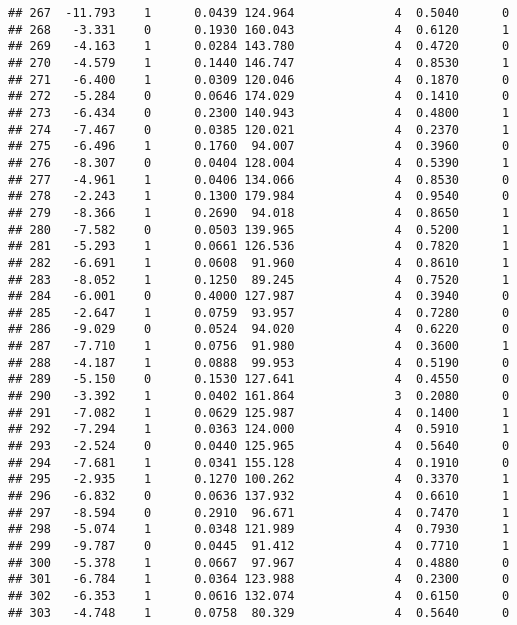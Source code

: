 \documentclass[
]{article}
\begin{document}
\begin{verbatim}
## 267  -11.793    1      0.0439 124.964              4  0.5040      0
## 268   -3.331    0      0.1930 160.043              4  0.6120      1
## 269   -4.163    1      0.0284 143.780              4  0.4720      0
## 270   -4.579    1      0.1440 146.747              4  0.8530      1
## 271   -6.400    1      0.0309 120.046              4  0.1870      0
## 272   -5.284    0      0.0646 174.029              4  0.1410      0
## 273   -6.434    0      0.2300 140.943              4  0.4800      1
## 274   -7.467    0      0.0385 120.021              4  0.2370      1
## 275   -6.496    1      0.1760  94.007              4  0.3960      0
## 276   -8.307    0      0.0404 128.004              4  0.5390      1
## 277   -4.961    1      0.0406 134.066              4  0.8530      0
## 278   -2.243    1      0.1300 179.984              4  0.9540      0
## 279   -8.366    1      0.2690  94.018              4  0.8650      1
## 280   -7.582    0      0.0503 139.965              4  0.5200      1
## 281   -5.293    1      0.0661 126.536              4  0.7820      1
## 282   -6.691    1      0.0608  91.960              4  0.8610      1
## 283   -8.052    1      0.1250  89.245              4  0.7520      1
## 284   -6.001    0      0.4000 127.987              4  0.3940      0
## 285   -2.647    1      0.0759  93.957              4  0.7280      0
## 286   -9.029    0      0.0524  94.020              4  0.6220      0
## 287   -7.710    1      0.0756  91.980              4  0.3600      1
## 288   -4.187    1      0.0888  99.953              4  0.5190      0
## 289   -5.150    0      0.1530 127.641              4  0.4550      0
## 290   -3.392    1      0.0402 161.864              3  0.2080      0
## 291   -7.082    1      0.0629 125.987              4  0.1400      1
## 292   -7.294    1      0.0363 124.000              4  0.5910      1
## 293   -2.524    0      0.0440 125.965              4  0.5640      0
## 294   -7.681    1      0.0341 155.128              4  0.1910      0
## 295   -2.935    1      0.1270 100.262              4  0.3370      1
## 296   -6.832    0      0.0636 137.932              4  0.6610      1
## 297   -8.594    0      0.2910  96.671              4  0.7470      1
## 298   -5.074    1      0.0348 121.989              4  0.7930      1
## 299   -9.787    0      0.0445  91.412              4  0.7710      1
## 300   -5.378    1      0.0667  97.967              4  0.4880      0
## 301   -6.784    1      0.0364 123.988              4  0.2300      0
## 302   -6.353    1      0.0616 132.074              4  0.6150      0
## 303   -4.748    1      0.0758  80.329              4  0.5640      0

\end{verbatim}
\end{document}
